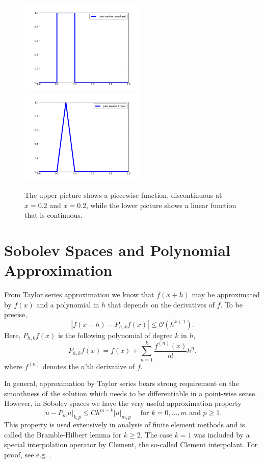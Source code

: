\begin{figure}
\begin{center}
\includegraphics[width=6cm]{chapters/SobolevCrash/pc.png}
\includegraphics[width=6cm]{chapters/SobolevCrash/pl.png}
\caption{The upper picture shows a piecewise function, discontinuous at $x=0.2$ and $x=0.2$, while
the lower picture shows a linear function that is continuous. }  
\label{fig:piecewise}
\end{center}
\end{figure}

\section{Sobolev Spaces and Polynomial Approximation}
From Taylor series approximation we know that  $f(x+h)$ may be approximated
by $f(x)$ and a polynomial in $h$ that depends on the derivatives of $f$. 
To be precise, 
\[
|f(x+h) - P_{h,k} f (x) |  \le  \mathcal{O}(h^{k+1}) .    
\]
Here, $P_{h,k} f(x)$ is the following polynomial of degree $k$ in $h$, 
\[
P_{h,k} f(x) = f(x) + \sum_{n=1}^k \frac{f^{(n)}(x)}{n!} h^n . 
\]
where $f^{(n)}$ denotes the $n$'th derivative of $f$. 

In general, approximation by Taylor series bears strong requirement on the smoothness 
of the solution which needs to be differentiable in a point-wise sense.   
However, in Sobolev spaces we have the very useful approximation property  
\begin{equation}
\label{bramblehilbert}
|u - P_m u|_{k,p} \le C h^{m-k} |u|_{m,p} \quad \mbox{ for } k=0,\ldots,m \mbox{ and }  p\ge 1. 
\end{equation}
This property is used extensively in analysis of finite element methods and
is called the Bramble-Hilbert lemma for $k\ge 2$. The case $k=1$ was included by a special interpolation operator by 
Clement, the so-called Clement interpolant. 
For proof, see e.g. \cite{braess2007finite, brenner2008mathematical}.  




